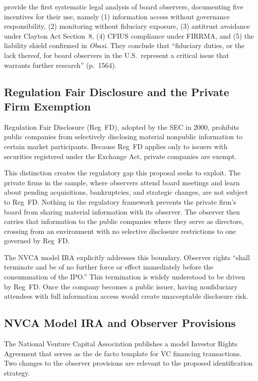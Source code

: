  provide the first systematic legal analysis of board observers, documenting five incentives for their use, namely (1) information access without governance responsibility, (2) monitoring without fiduciary exposure, (3) antitrust avoidance under Clayton Act Section~8, (4) CFIUS compliance under FIRRMA, and (5) the liability shield confirmed in \textit{Obasi}. They conclude that ``fiduciary duties, or the lack thereof, for board observers in the U.S.\ represent a critical issue that warrants further research'' (p.~1564).

\subsection{Regulation Fair Disclosure and the Private Firm Exemption}

Regulation Fair Disclosure (Reg~FD), adopted by the SEC in 2000, prohibits public companies from selectively disclosing material nonpublic information to certain market participants. Because Reg~FD applies only to issuers with securities registered under the Exchange Act, private companies are exempt.

This distinction creates the regulatory gap this proposal seeks to exploit. The private firms in the sample, where observers attend board meetings and learn about pending acquisitions, bankruptcies, and strategic changes, are not subject to Reg~FD. Nothing in the regulatory framework prevents the private firm's board from sharing material information with its observer. The observer then carries that information to the public companies where they serve as directors, crossing from an environment with no selective disclosure restrictions to one governed by Reg~FD.

The NVCA model IRA explicitly addresses this boundary. Observer rights ``shall terminate and be of no further force or effect immediately before the consummation of the IPO.'' This termination is widely understood to be driven by Reg~FD. Once the company becomes a public issuer, having nonfiduciary attendees with full information access would create unacceptable disclosure risk.

\subsection{NVCA Model IRA and Observer Provisions}

The National Venture Capital Association publishes a model Investor Rights Agreement that serves as the de facto template for VC financing transactions. Two changes to the observer provisions are relevant to the proposed identification strategy.

